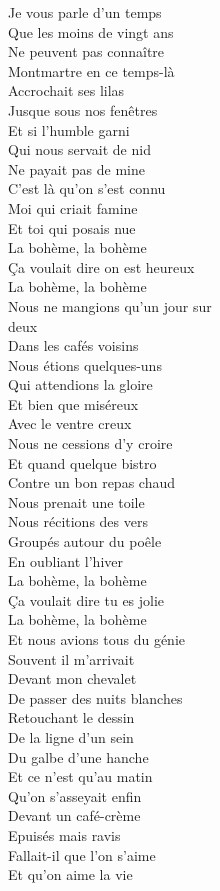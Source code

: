 \documentclass{novel}
\begin{document}
\begin{multicols}{2}
Je vous parle d'un temps \\
Que les moins de vingt ans \\
Ne peuvent pas connaître \\
Montmartre en ce temps-là \\
Accrochait ses lilas \\
Jusque sous nos fenêtres \\
Et si l'humble garni \\
Qui nous servait de nid \\
Ne payait pas de mine \\
C'est là qu'on s'est connu \\
Moi qui criait famine \\
Et toi qui posais nue \small \\

\normalsize
La bohème, la bohème \\
Ça voulait dire on est heureux \\
La bohème, la bohème \\
Nous ne mangions qu'un jour sur \\
deux \\

Dans les cafés voisins \\
Nous étions quelques-uns \\
Qui attendions la gloire \\
Et bien que miséreux \\
Avec le ventre creux \\
Nous ne cessions d'y croire \\
Et quand quelque bistro \\
Contre un bon repas chaud \\
Nous prenait une toile \\
Nous récitions des vers \\
Groupés autour du poêle \\
En oubliant l'hiver \\

La bohème, la bohème \\
Ça voulait dire tu es jolie \\
La bohème, la bohème \\
Et nous avions tous du génie \\

Souvent il m'arrivait \\
Devant mon chevalet \\
De passer des nuits blanches \\
Retouchant le dessin \\
De la ligne d'un sein \\
Du galbe d'une hanche \\
Et ce n'est qu'au matin \\
Qu'on s'asseyait enfin \\
Devant un café-crème \\
Epuisés mais ravis \\
Fallait-il que l'on s'aime \\
Et qu'on aime la vie \\


\end{multicols}
\end{document}
